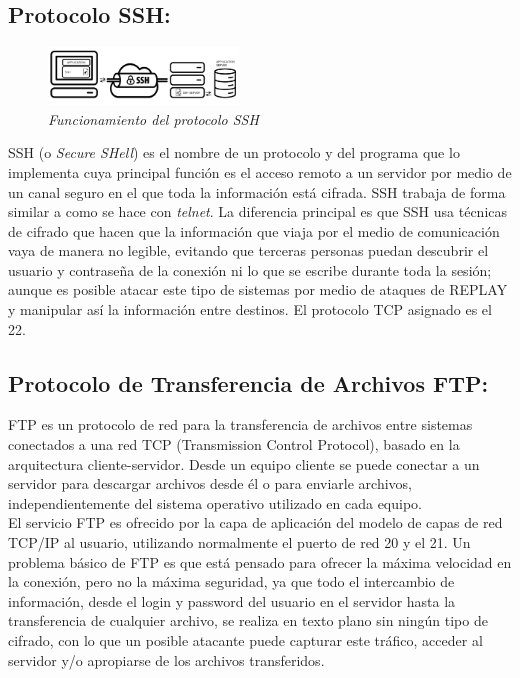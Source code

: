 \documentclass[conference]{IEEEtran}
\begin{document}
\subsection{\textbf{Protocolo SSH:}}
\begin{figure}[h]
	\centerline{\includegraphics[width=0.45\textwidth]{img/ant02.png}}
	\caption{\textit{Funcionamiento del protocolo SSH}}
	\label{fig:ant02}
\end{figure}

SSH (o \textit{Secure SHell}) es el nombre de un protocolo y del programa que lo implementa cuya principal función es el acceso remoto a un servidor por medio de un canal seguro en el que toda la información está cifrada. SSH trabaja de forma similar a como se hace con \textit{telnet}. La diferencia principal es que SSH usa técnicas de cifrado que hacen que la información que viaja por el medio de comunicación vaya de manera no legible, evitando que terceras personas puedan descubrir el usuario y contraseña de la conexión ni lo que se escribe durante toda la sesión; aunque es posible atacar este tipo de sistemas por medio de ataques de REPLAY y manipular así la información entre destinos. El protocolo TCP asignado es el 22.

\subsection{\textbf{ Protocolo de Transferencia de Archivos FTP:}}
FTP es un protocolo de red para la transferencia de archivos entre sistemas conectados a una red TCP (Transmission Control Protocol), basado en la arquitectura cliente-servidor. Desde un equipo cliente se puede conectar a un servidor para descargar archivos desde él o para enviarle archivos, independientemente del sistema operativo utilizado en cada equipo.\\
El servicio FTP es ofrecido por la capa de aplicación del modelo de capas de red TCP/IP al usuario, utilizando normalmente el puerto de red 20 y el 21. Un problema básico de FTP es que está pensado para ofrecer la máxima velocidad en la conexión, pero no la máxima seguridad, ya que todo el intercambio de información, desde el login y password del usuario en el servidor hasta la transferencia de cualquier archivo, se realiza en texto plano sin ningún tipo de cifrado, con lo que un posible atacante puede capturar este tráfico, acceder al servidor y/o apropiarse de los archivos transferidos.
\end{document}
